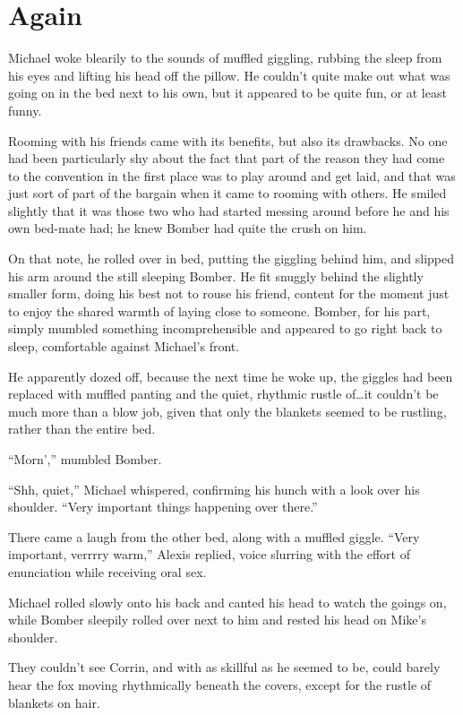 \chapter{Again}

Michael woke blearily to the sounds of muffled giggling, rubbing the sleep from his eyes and lifting his head off the pillow. He couldn't quite make out what was going on in the bed next to his own, but it appeared to be quite fun, or at least funny.

Rooming with his friends came with its benefits, but also its drawbacks. No one had been particularly shy about the fact that part of the reason they had come to the convention in the first place was to play around and get laid, and that was just sort of part of the bargain when it came to rooming with others. He smiled slightly that it was those two who had started messing around before he and his own bed-mate had; he knew Bomber had quite the crush on him.

On that note, he rolled over in bed, putting the giggling behind him, and slipped his arm around the still sleeping Bomber. He fit snuggly behind the slightly smaller form, doing his best not to rouse his friend, content for the moment just to enjoy the shared warmth of laying close to someone. Bomber, for his part, simply mumbled something incomprehensible and appeared to go right back to sleep, comfortable against Michael's front.

He apparently dozed off, because the next time he woke up, the giggles had been replaced with muffled panting and the quiet, rhythmic rustle of\ldots{}it couldn't be much more than a blow job, given that only the blankets seemed to be rustling, rather than the entire bed.

``Morn','' mumbled Bomber.

``Shh, quiet,'' Michael whispered, confirming his hunch with a look over his shoulder. ``Very important things happening over there.''

There came a laugh from the other bed, along with a muffled giggle. ``Very important, verrrry warm,'' Alexis replied, voice slurring with the effort of enunciation while receiving oral sex.

Michael rolled slowly onto his back and canted his head to watch the goings on, while Bomber sleepily rolled over next to him and rested his head on Mike's shoulder.

They couldn't see Corrin, and with as skillful as he seemed to be, could barely hear the fox moving rhythmically beneath the covers, except for the rustle of blankets on hair.

